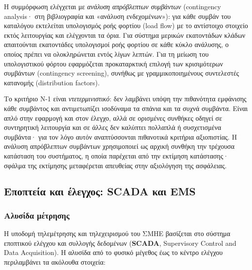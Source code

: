 Η συμμόρφωση ελέγχεται με \emph{ανάλυση απρόβλεπτων συμβάντων} (contingency analysis· στη
βιβλιογραφία και «ανάλυση ενδεχομένων»): για κάθε συμβάν του καταλόγου εκτελείται
υπολογισμός ροής φορτίου (load flow) με το αντίστοιχο στοιχείο εκτός λειτουργίας και
ελέγχονται τα όρια. Για σύστημα μερικών εκατοντάδων κλάδων απαιτούνται εκατοντάδες
υπολογισμοί ροής φορτίου σε κάθε κύκλο ανάλυσης, ο οποίος πρέπει να ολοκληρώνεται εντός
λίγων λεπτών. Για τη μείωση του υπολογιστικού φόρτου εφαρμόζεται προκαταρκτική επιλογή των
κρισιμότερων συμβάντων (contingency screening), συνήθως με γραμμικοποιημένους συντελεστές
κατανομής (distribution factors).

Το κριτήριο N-1 είναι \emph{ντετερμινιστικό}: δεν λαμβάνει υπόψη την πιθανότητα εμφάνισης
κάθε συμβάντος και αντιμετωπίζει ισοδύναμα τα σπάνια και τα συχνά συμβάντα. Είναι απλό στην
εφαρμογή και στον έλεγχο, αλλά σε ορισμένες συνθήκες οδηγεί σε συντηρητική λειτουργία και σε
άλλες δεν καλύπτει πολλαπλά ή συσχετισμένα συμβάντα· για τον λόγο αυτόν αναπτύσσονται
πιθανοτικά κριτήρια αξιοπιστίας. Η ανάλυση απρόβλεπτων συμβάντων χρησιμοποιεί ως αρχική
συνθήκη την τρέχουσα κατάσταση του συστήματος, η οποία παρέχεται από την εκτίμηση
κατάστασης· σφάλμα της εκτίμησης μεταφέρεται απευθείας στην αξιολόγηση της ασφάλειας.

\subsection{Εποπτεία και έλεγχος: SCADA και EMS}

\subsubsection*{Αλυσίδα μέτρησης}

Η υποδομή τηλεμέτρησης και τηλεχειρισμού του ΣΜΗΕ βασίζεται στο σύστημα εποπτικού ελέγχου
και συλλογής δεδομένων (\textbf{SCADA}, Supervisory Control and Data Acquisition). Η αλυσίδα
από το φυσικό μέγεθος έως το κέντρο ελέγχου περιλαμβάνει τα ακόλουθα στοιχεία:

